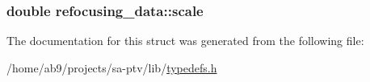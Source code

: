\hypertarget{structrefocusing__data_af527d110a3aabac71d3c9a8a68de92eb}{
\subsubsection[{scale}]{\setlength{\rightskip}{0pt plus 5cm}double refocusing\-\_\-data\-::scale}}\label{d3/d46/structrefocusing__data_af527d110a3aabac71d3c9a8a68de92eb}


The documentation for this struct was generated from the following file\-:\begin{DoxyCompactItemize}
\item 
/home/ab9/projects/sa-\/ptv/lib/\hyperlink{typedefs_8h}{typedefs.\-h}\end{DoxyCompactItemize}
